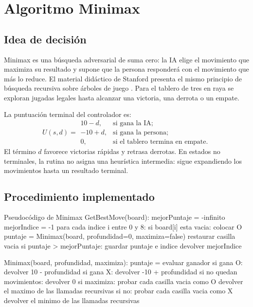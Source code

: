 \chapter{Algoritmo Minimax}
\section{Idea de decisión}
Minimax es una búsqueda adversarial de suma cero: la IA elige el movimiento que maximiza su resultado y supone que la persona responderá con el movimiento que más lo reduce. El material didáctico de Stanford presenta el mismo principio de búsqueda recursiva sobre árboles de juego \cite{stanfordMinimax}. Para el tablero de tres en raya se exploran jugadas legales hasta alcanzar una victoria, una derrota o un empate.

La puntuación terminal del controlador es:
\[
U(s,d)=
\begin{array}{ll}
10-d, & \mbox{si gana la IA;}\\
-10+d, & \mbox{si gana la persona;}\\
0, & \mbox{si el tablero termina en empate.}
\end{array}
\]
El término $d$ favorece victorias rápidas y retrasa derrotas. En estados no terminales, la rutina no asigna una heurística intermedia: sigue expandiendo los movimientos hasta un resultado terminal.

\section{Procedimiento implementado}
\begin{codigobox}{Pseudocódigo de Minimax}
GetBestMove(board):
    mejorPuntaje = -infinito
    mejorIndice = -1
    para cada indice i entre 0 y 8:
        si board[i] esta vacia:
            colocar O
            puntaje = Minimax(board, profundidad=0, maximiza=false)
            restaurar casilla vacia
            si puntaje > mejorPuntaje:
                guardar puntaje e indice
    devolver mejorIndice

Minimax(board, profundidad, maximiza):
    puntaje = evaluar ganador
    si gana O: devolver 10 - profundidad
    si gana X: devolver -10 + profundidad
    si no quedan movimientos: devolver 0
    si maximiza:
        probar cada casilla vacia como O
        devolver el maximo de las llamadas recursivas
    si no:
        probar cada casilla vacia como X
        devolver el minimo de las llamadas recursivas
\end{codigobox}

